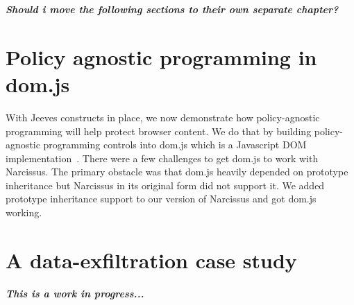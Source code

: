 \textbf{\textit{Should i move the following sections to their own separate chapter?}}
\section{Policy agnostic programming in dom.js}
With Jeeves constructs in place, we now demonstrate how policy-agnostic programming
will help protect browser content. We do that by building policy-agnostic programming
controls into dom.js which is a Javascript DOM implementation~\cite{dom.js}. There
were a few challenges to get dom.js to work with Narcissus. The primary obstacle
was that dom.js heavily depended on prototype inheritance but Narcissus in its
original form did not support it. We added prototype inheritance support to our
version of Narcissus and got dom.js working.

\section{A data-exfiltration case study}


\textbf{\textit{This is a work in progress...}}
